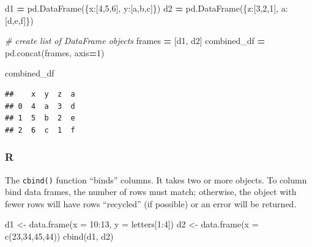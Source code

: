 \documentclass[
]{book}
\newenvironment{Shaded}{\begin{snugshade}}{\end{snugshade}}
\newcommand{\AttributeTok}[1]{\textcolor[rgb]{0.77,0.63,0.00}{#1}}
\newcommand{\CommentTok}[1]{\textcolor[rgb]{0.56,0.35,0.01}{\textit{#1}}}
\newcommand{\DecValTok}[1]{\textcolor[rgb]{0.00,0.00,0.81}{#1}}
\newcommand{\FunctionTok}[1]{\textcolor[rgb]{0.00,0.00,0.00}{#1}}
\newcommand{\NormalTok}[1]{#1}
\newcommand{\OperatorTok}[1]{\textcolor[rgb]{0.81,0.36,0.00}{\textbf{#1}}}
\newcommand{\OtherTok}[1]{\textcolor[rgb]{0.56,0.35,0.01}{#1}}
\newcommand{\SpecialCharTok}[1]{\textcolor[rgb]{0.00,0.00,0.00}{#1}}
\newcommand{\StringTok}[1]{\textcolor[rgb]{0.31,0.60,0.02}{#1}}
\begin{document}
\begin{Shaded}
\begin{Highlighting}[]

\NormalTok{d1 }\OperatorTok{=}\NormalTok{ pd.DataFrame(\{}\StringTok{\textquotesingle{}x\textquotesingle{}}\NormalTok{:[}\DecValTok{4}\NormalTok{,}\DecValTok{5}\NormalTok{,}\DecValTok{6}\NormalTok{], }\StringTok{\textquotesingle{}y\textquotesingle{}}\NormalTok{:[}\StringTok{\textquotesingle{}a\textquotesingle{}}\NormalTok{,}\StringTok{\textquotesingle{}b\textquotesingle{}}\NormalTok{,}\StringTok{\textquotesingle{}c\textquotesingle{}}\NormalTok{]\})}
\NormalTok{d2 }\OperatorTok{=}\NormalTok{ pd.DataFrame(\{}\StringTok{\textquotesingle{}z\textquotesingle{}}\NormalTok{:[}\DecValTok{3}\NormalTok{,}\DecValTok{2}\NormalTok{,}\DecValTok{1}\NormalTok{], }\StringTok{\textquotesingle{}a\textquotesingle{}}\NormalTok{:[}\StringTok{\textquotesingle{}d\textquotesingle{}}\NormalTok{,}\StringTok{\textquotesingle{}e\textquotesingle{}}\NormalTok{,}\StringTok{\textquotesingle{}f\textquotesingle{}}\NormalTok{]\})}

\CommentTok{\# create list of DataFrame objects}
\NormalTok{frames }\OperatorTok{=}\NormalTok{ [d1, d2]}
\NormalTok{combined\_df }\OperatorTok{=}\NormalTok{ pd.concat(frames, axis}\OperatorTok{=}\DecValTok{1}\NormalTok{)}

\NormalTok{combined\_df}
\end{Highlighting}
\end{Shaded}

\begin{verbatim}
##    x  y  z  a
## 0  4  a  3  d
## 1  5  b  2  e
## 2  6  c  1  f
\end{verbatim}

\hypertarget{r-31}{%
\subsubsection*{R}\label{r-31}}

The \texttt{cbind()} function ``binds'' columns. It takes two or more objects. To column bind data frames, the number of rows must match; otherwise, the object with fewer rows will have rows ``recycled'' (if possible) or an error will be returned.

\begin{Shaded}
\begin{Highlighting}[]
\NormalTok{d1 }\OtherTok{\textless{}{-}} \FunctionTok{data.frame}\NormalTok{(}\AttributeTok{x =} \DecValTok{10}\SpecialCharTok{:}\DecValTok{13}\NormalTok{, }\AttributeTok{y =}\NormalTok{ letters[}\DecValTok{1}\SpecialCharTok{:}\DecValTok{4}\NormalTok{])}
\NormalTok{d2 }\OtherTok{\textless{}{-}} \FunctionTok{data.frame}\NormalTok{(}\AttributeTok{x =} \FunctionTok{c}\NormalTok{(}\DecValTok{23}\NormalTok{,}\DecValTok{34}\NormalTok{,}\DecValTok{45}\NormalTok{,}\DecValTok{44}\NormalTok{))}
\FunctionTok{cbind}\NormalTok{(d1, d2)}
\end{Highlighting}
\end{Shaded}
\end{document}
